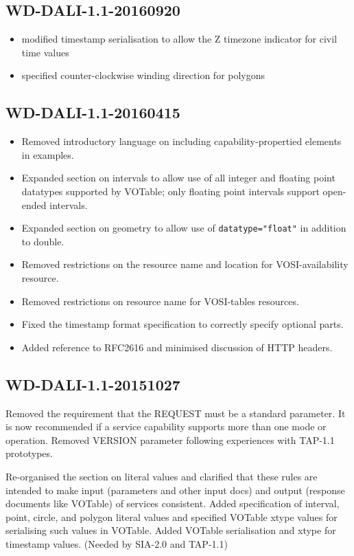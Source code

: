 \documentclass[11pt,letter]{ivoa}
\begin{document}
\subsection{WD-DALI-1.1-20160920}

\begin{itemize}
\item modified timestamp serialisation to allow the Z timezone indicator for 
civil time values
\item specified counter-clockwise winding direction for polygons
\end{itemize}

\subsection{WD-DALI-1.1-20160415}

\begin{itemize}
\item Removed introductory language on including capability-propertied elements in
examples.
\item Expanded section on intervals to allow use of all integer and floating point datatypes 
supported by VOTable; only floating point intervals support open-ended intervals.
\item Expanded section on geometry to allow use of \verb|datatype="float"| in addition to double.
\item Removed restrictions on the resource name and location for VOSI-availability resource.
\item Removed restrictions on resource name for VOSI-tables resources.
\item Fixed the timestamp format specification to correctly specify optional parts.
\item Added reference to RFC2616 and minimised discussion of HTTP headers.
\end{itemize}

\subsection{WD-DALI-1.1-20151027}

Removed the requirement that the REQUEST must be a standard parameter. It is 
now recommended if a service capability supports more than one mode or 
operation. Removed VERSION parameter following experiences with TAP-1.1 
prototypes.

Re-organised the section on literal values and clarified that these rules 
are intended to make input (parameters and other input docs) and output 
(response documents like VOTable) of services consistent. Added specification 
of interval, point, circle, and polygon literal values and specified VOTable 
xtype values for serialising such values in VOTable. Added VOTable serialisation 
and xtype for timestamp values. (Needed by SIA-2.0 and TAP-1.1)
\end{document}
